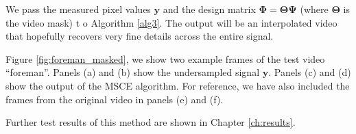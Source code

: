 We pass the measured pixel values $\bm y$ and the design matrix $\bm\Phi = \bm\Theta\bm\Psi$ (where $\bm\Theta$ is the video mask) t
o Algorithm \ref{alg3}.
The output will be an interpolated video that hopefully recovers very fine details across the entire signal.

Figure \ref{fig:foreman_masked}, we show two example frames of the test video ``foreman''.
Panels (a) and (b) show the undersampled signal $\bm y$.
Panels (c) and (d) show the output of the MSCE algorithm.
For reference, we have also included the frames from the original video in panels (e) and (f).

Further test results of this method are shown in Chapter \ref{ch:results}.
